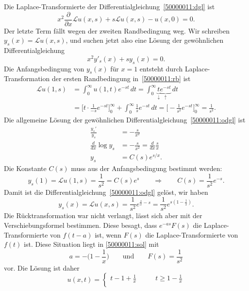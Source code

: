 \begin{loesung}
Die Laplace-Transformierte der Differentialgleichung~\eqref{50000011:dgl} ist
\begin{equation}
x^2\frac{\partial}{\partial x}\mathscr{L}u(x,s) + s\mathscr{L}u(x,s) - u(x,0)=0.
\end{equation}
Der letzte Term fällt wegen der zweiten Randbedingung weg.
Wir schreiben $y_s(x)=\mathscr{L}u(x,s)$, und suchen jetzt also eine Lösung
der gewöhnlichen Differentialgleichung
\begin{equation}
x^2y'_s(x) + sy_s(x)=0.
\label{50000011:odgl}
\end{equation}
Die Anfangsbedingung von $y_s(x)$ für $x=1$ entsteht durch
Laplace-Transformation der ersten Randbedingung in~\eqref{50000011:rb} ist
\begin{align*}
\mathscr{L}u(1,s)
&=
\int_0^\infty u(1,t)e^{-st}\,dt
=
\int_0^\infty \underbrace{t}_{\downarrow}\underbrace{e^{-st}}_{\uparrow}\,dt
\\
&=
\biggl[
t\cdot \frac1{-s}e^{-st}
\biggr]_0^\infty
+\int_0^\infty \frac1se^{-st}\,dt
=
\biggl[
-\frac1{s^2}e^{-st}
\biggr]_0^\infty=\frac1{s^2}.
\end{align*}
Die allgemeine Lösung der gewöhnlichen Differentialgleichung~\eqref{50000011:odgl} ist
\begin{align*}
\frac{y_s'}{y_s}&=-\frac{s}{x^2}
\\
\frac{d}{dx} \log y_s &= -\frac{s}{x^2}=\frac{d}{dx}\frac{s}{x}
\\
y_s&=C(s)e^{s/x}.
\end{align*}
Die Konstante $C(s)$ muss aus der Anfangsbedingung bestimmt werden:
\[
y_s(1)=\mathscr{L}u(1,s)=\frac1{s^2}=C(s)e^{s}
\qquad\Rightarrow\qquad
C(s)=\frac1{s^2}e^{-s}.
\]
Damit ist die Differentialgleichung~\eqref{50000011:odgl} gelöst, wir haben
\begin{equation}
y_s(x)
=
\mathscr{L}u(x,s)
=
\frac1{s^2}e^{\frac{s}{x}-s}
=
\frac1{s^2}e^{s(1-\frac1x)}.
\label{50000011:sol}
\end{equation}
Die Rücktransformation war nicht verlangt, lässt sich aber mit der
Verschiebungsformel bestimmen.
Diese besagt, dass $e^{-as}F(s)$ die Laplace-Transformierte von 
$f(t-a)$ ist, wenn $F(s)$ die Laplace-Transformierte von $f(t)$ ist.
Diese Situation liegt in \eqref{50000011:sol} mit
\[
a = -\biggl(1-\frac1x\biggr)
\qquad\text{und}\qquad
F(s)=\frac1{s^2}
\]
vor.
Die Lösung ist daher
\[
u(x,t)
=
\begin{cases}
t-1+\frac1x
&\qquad t \ge 1-\frac1x
\\

\end{cases}\]
\end{loesung}

